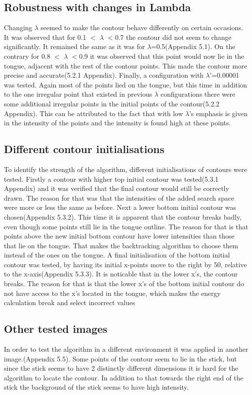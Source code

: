 \documentclass[12pt,a4paper,twocolumn]{article}
\begin{document}
\subsection{Robustness with changes in Lambda}
Changing $\lambda$ seemed to make the contour behave differently on certain occasions. 
It was observed that for 0.1 $<$ $\lambda$ $<$0.7 the contour did not seem to change significantly. It remained the same as it was for $\lambda$=0.5(Appendix 5.1).
On the contrary for 0.8 $<$ $\lambda$ $<$0.9 it was observed that this point would now lie in the tongue, adjacent with the rest of the contour points. This made the contour more precise and accurate(5.2.1 Appendix).
Finally, a configuration with $\lambda$'=0.00001 was tested. Again most of the points lied on the tongue, but this time in addition to the one irregular point that existed in previous $\lambda$ configurations there were some additional irregular points in the initial points of the contour(5.2.2 Appendix). This can be attributed to the fact that with low $\lambda$'s emphasis is given in the intensity of the points and the intensity is found high at these points.
\subsection{Different contour initialisations}
To identify the strength of the algorithm, different initialisations of contours were tested.
Firstly a contour with higher top initial contour was tested(5.3.1 Appendix) and it was verified that the final contour would still be correctly drawn. The reason for that was that the intensities of the added search space were more or less the same as before. Next a lower bottom initial contour was chosen(Appendix 5.3.2). This time it is apparent that the contour breaks badly, even though some points still lie in the tongue outline. The reason for that is that points above the new initial bottom contour have lower intensities than those that lie on the tongue. That makes the backtracking algorithm to choose them instead of the ones on the tongue.
A final initialisation of the bottom initial contour was tested, by having its initial x-points move to the right by 50, relative to the x-axis(Appendix 5.3.3). It is noticable that in the lower x's, the contour breaks. The reason for that is that the lower x's of the bottom initial contour do not have access to the x's located in the tongue, which makes the energy calculation break and select incorrect values
\subsection{Other tested images}
In order to test the algorithm in a different environment it was applied in another image.(Appendix 5.5). Some points of the contour seem to lie in the stick, but since the stick seems to have 2 distinctly different dimensions it is hard for the algorithm to locate the contour. In addition to that towards the right end of the stick the background of the stick seems to have high intensity.
\end{document}
